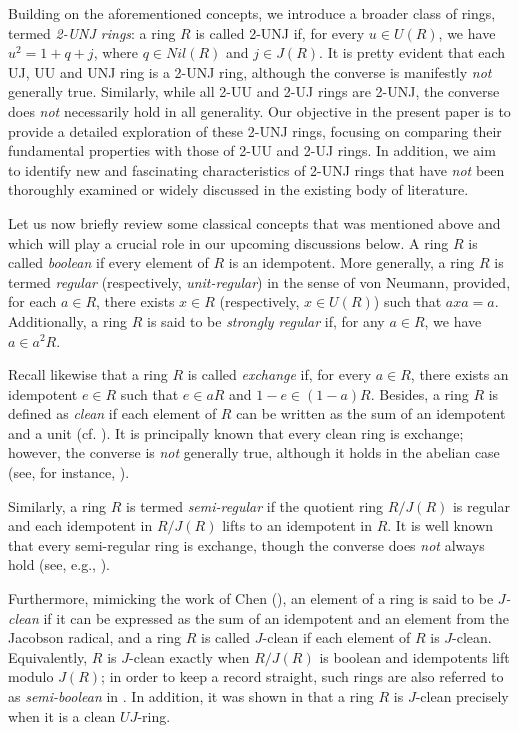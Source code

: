 \documentclass[12pt]{amsart}
\theoremstyle{definition}
\begin{document}
Building on the aforementioned concepts, we introduce a broader class of rings, termed {\it 2-UNJ rings}: a ring \( R \) is called 2-UNJ if, for every \( u \in U(R) \), we have \( u^2 = 1 + q + j \), where \( q \in Nil(R) \) and \( j \in J(R) \). It is pretty evident that each UJ, UU and UNJ ring is a 2-UNJ ring, although the converse is manifestly {\it not} generally true. Similarly, while all 2-UU and 2-UJ rings are 2-UNJ, the converse does {\it not} necessarily hold in all generality. Our objective in the present paper is to provide a detailed exploration of these 2-UNJ rings, focusing on comparing their fundamental properties with those of 2-UU and 2-UJ rings. In addition, we aim to identify new and fascinating characteristics of 2-UNJ rings that have {\it not} been thoroughly examined or widely discussed in the existing body of literature.

Let us now briefly review some classical concepts that was mentioned above and which will play a crucial role in our upcoming discussions below. A ring \( R \) is called {\it boolean} if every element of \( R \) is an idempotent. More generally, a ring \( R \) is termed {\it regular} (respectively, {\it unit-regular}) in the sense of von Neumann, provided, for each \( a \in R \), there exists \( x \in R \) (respectively, \( x \in U(R) \)) such that \( axa = a \). Additionally, a ring \( R \) is said to be {\it strongly regular} if, for any \( a \in R \), we have \( a \in a^2R \).

Recall likewise that a ring \( R \) is called {\it exchange} if, for every \( a \in R \), there exists an idempotent \( e \in R \) such that \( e \in aR \) and \( 1 - e \in (1 - a)R \). Besides, a ring \( R \) is defined as {\it clean} if each element of \( R \) can be written as the sum of an idempotent and a unit (cf. \cite{8}). It is principally known that every clean ring is exchange; however, the converse is {\it not} generally true, although it holds in the abelian case (see, for instance, \cite[Proposition 1.8]{8}).

Similarly, a ring \( R \) is termed {\it semi-regular} if the quotient ring \( R/J(R) \) is regular and each idempotent in \( R/J(R) \) lifts to an idempotent in \( R \). It is well known that every semi-regular ring is exchange, though the converse does {\it not} always hold (see, e.g., \cite{8}).

Furthermore, mimicking the work of Chen (\cite{16}), an element of a ring is said to be {\it \( J \)-clean} if it can be expressed as the sum of an idempotent and an element from the Jacobson radical, and a ring \( R \) is called \( J \)-clean if each element of \( R \) is \( J \)-clean. Equivalently, $R$ is \( J \)-clean exactly when \( R/J(R) \) is boolean and idempotents lift modulo \( J(R) \); in order to keep a record straight, such rings are also referred to as {\it semi-boolean} in \cite{25}. In addition, it was shown in \cite{14} that a ring \( R \) is \( J \)-clean precisely when it is a clean \( UJ \)-ring.
\end{document}
